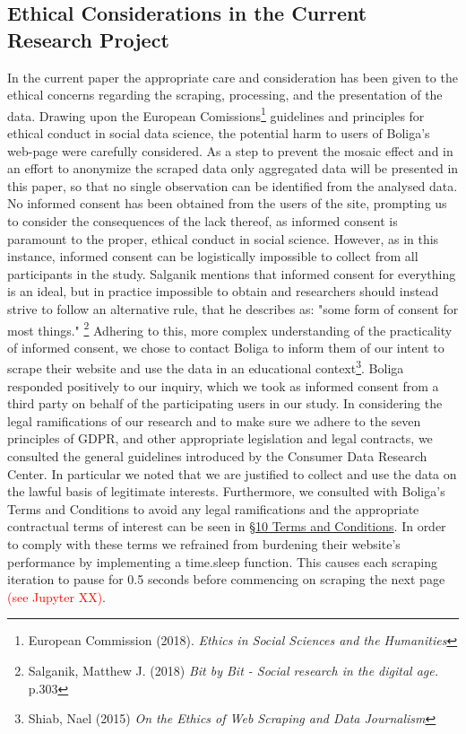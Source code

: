 \documentclass[12pt,a4paper]{article}
\begin{document}
\subsection{Ethical Considerations in the Current Research Project}
In the current paper the appropriate care and consideration has been given to the ethical concerns regarding the scraping, processing, and the presentation of the data. Drawing upon the European Comissions\footnote{European Commission (2018). \textit{Ethics in Social Sciences and the Humanities}} guidelines and principles for ethical conduct in social data science, the potential harm to users of Boliga's web-page were carefully considered. As a step to prevent the mosaic effect and in an effort to anonymize the scraped data only aggregated data will be presented in this paper, so that no single observation can be identified from the analysed data.\newline
No informed consent has been obtained from the users of the site, prompting us to consider the consequences of the lack thereof, as informed consent is paramount to the proper, ethical conduct in social science. However, as in this instance, informed consent can be logistically impossible to collect from all participants in the study. Salganik mentions that informed consent for everything is an ideal, but in practice impossible to obtain and researchers should instead strive to follow an alternative rule, that he describes as: "some form of consent for most things." \footnote{Salganik, Matthew J. (2018) \textit{Bit by Bit - Social research in the digital age.} p.303} Adhering to this, more complex understanding of the practicality of informed consent, we chose to contact Boliga to inform them of our intent to scrape their website and use the data in an educational context\footnote{Shiab, Nael (2015) \textit{On the Ethics of Web Scraping and Data Journalism}}. Boliga responded positively to our inquiry, which we took as informed consent from a third party on behalf of the participating users in our study.\newline
In considering the legal ramifications of our research and to make sure we adhere to the seven principles of GDPR, and other appropriate legislation and legal contracts, we consulted the general guidelines introduced by the Consumer Data Research Center. In particular we noted that we are justified to collect and use the data on the lawful basis of legitimate interests. Furthermore, we consulted with Boliga's Terms and Conditions to avoid any legal ramifications and the appropriate contractual terms of interest can be seen in \href{https://www.boliga.dk/vilkaar-og-betingelser}{§10 Terms and Conditions}. In order to comply with these terms we refrained from burdening their website's performance by implementing a time.sleep function. This causes each scraping iteration to pause for 0.5 seconds before commencing on scraping the next page \textcolor{red}{(see Jupyter XX)}. 
\end{document}

